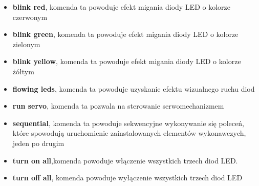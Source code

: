 \begin{itemize}
	\\
	\item \textbf{blink red}, komenda ta powoduje efekt migania diody LED o kolorze czerwonym
	\\
\item \textbf{blink green}, komenda ta powoduje efekt migania diody LED o kolorze zielonym
	\\
	\item \textbf{blink yellow}, komenda ta powoduje efekt migania diody LED o kolorze żółtym
	\\
\item \textbf{flowing leds}, komenda ta powoduje uzyskanie efektu wizualnego ruchu diod
	\\
	\item \textbf{run servo}, komenda ta pozwala na sterowanie serwomechanizmem
	\\
\item \textbf{sequential}, komenda ta powoduje sekwencyjne wykonywanie się poleceń, które spowodują uruchomienie zainstalowanych elementów wykonawczych, jeden po drugim
	\\
	\item \textbf{turn on all},komenda powoduje włączenie wszystkich trzech diod LED.
	\\
\item \textbf{turn off all}, komenda powoduje wyłączenie wszystkich trzech diod LED
	\\
\end{itemize}
